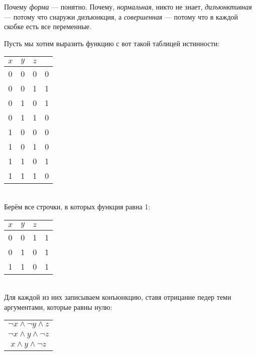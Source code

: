 \documentclass{article}
\begin{document}
\begin{itemize}
        \begin{Comment}
            Почему \textit{форма} --- понятно. Почему, \textit{нормальная}, никто не знает, \textit{дизъюнктивная} --- потому что снаружи дизъюнкция, а \textit{совершенная} --- потому что в каждой скобке есть все переменные.
        \end{Comment}
        \begin{Example}
            Пусть мы хотим выразить функцию с вот такой таблицей истинности:\\
            \begin{tabular}{|ccc|c|}
                \hline
                $x$ & $y$ & $z$ & \\
                \hline
                0 & 0 & 0 & 0\\
                0 & 0 & 1 & 1\\
                0 & 1 & 0 & 1\\
                0 & 1 & 1 & 0\\
                1 & 0 & 0 & 0\\
                1 & 0 & 1 & 0\\
                1 & 1 & 0 & 1\\
                1 & 1 & 1 & 0\\
                \hline
            \end{tabular}\\
            Берём все строчки, в которых функция равна 1:\\
            \begin{tabular}{|ccc|c|}
                \hline
                $x$ & $y$ & $z$ & \\
                \hline
                0 & 0 & 1 & 1\\
                0 & 1 & 0 & 1\\
                1 & 1 & 0 & 1\\
                \hline
            \end{tabular}\\
            Для каждой из них записываем конъюнкцию, ставя отрицание педер теми аргументами, которые равны нулю:\\
            \begin{tabular}{|c|}
                \hline
                $\neg x\land\neg y\land z$\\
                $\neg x\land y\land\neg z$\\
                $x\land y\land\neg z$\\
                \hline

\end{tabular}
\end{Example}
\end{itemize}
\end{document}
